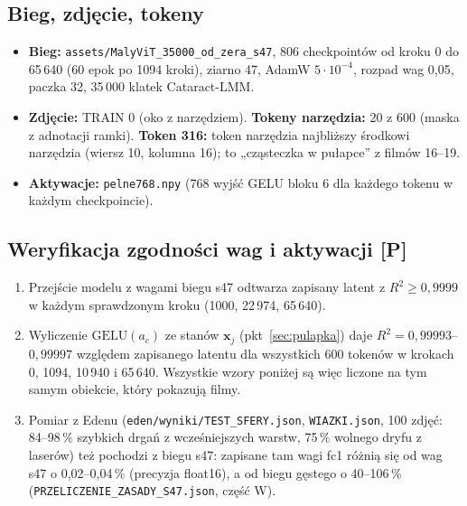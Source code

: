 \documentclass[a4paper,11pt]{article}
\newcommand{\stP}{\textcolor{pom}{\textsf{\textbf{[P]}}}}
\newcommand{\GELU}{\mathrm{GELU}}
\begin{document}
\subsection{Bieg, zdjęcie, tokeny}
\begin{itemize}
\item \textbf{Bieg:} \texttt{assets/MalyViT\_35000\_od\_zera\_s47}, 806 checkpointów od kroku 0 do 65\,640 (60 epok po 1094 kroki),
ziarno 47, AdamW $5\cdot10^{-4}$, rozpad wag 0,05, paczka 32, 35\,000 klatek Cataract-LMM.
\item \textbf{Zdjęcie:} TRAIN 0 (oko z narzędziem). \textbf{Tokeny narzędzia:} 20 z 600 (maska z adnotacji ramki).
\textbf{Token 316:} token narzędzia najbliższy środkowi narzędzia (wiersz 10, kolumna 16); to „cząsteczka w pułapce” z filmów 16--19.
\item \textbf{Aktywacje:} \texttt{pelne768.npy} (768 wyjść GELU bloku 6 dla każdego tokenu w każdym checkpoincie).
\end{itemize}

\subsection{Weryfikacja zgodności wag i aktywacji \stP}
\begin{enumerate}
\item Przejście modelu z wagami biegu s47 odtwarza zapisany latent z $R^2\ge0{,}9999$ w każdym sprawdzonym kroku (1000, 22\,974, 65\,640).
\item Wyliczenie $\GELU(a_c)$ ze stanów $\bm x_j$ (pkt~\ref{sec:pulapka}) daje $R^2 = 0{,}99993$--$0{,}99997$ względem zapisanego latentu
dla wszystkich 600 tokenów w krokach 0, 1094, 10\,940 i 65\,640. Wszystkie wzory poniżej są więc liczone na tym samym obiekcie,
który pokazują filmy.
\item Pomiar z Edenu (\texttt{eden/wyniki/TEST\_SFERY.json}, \texttt{WIAZKI.json}, 100 zdjęć: 84--98\,\% szybkich drgań z wcześniejszych
warstw, 75\,\% wolnego dryfu z laserów) też pochodzi z biegu s47: zapisane tam wagi fc1 różnią się od wag s47 o 0,02--0,04\,\%
(precyzja float16), a od biegu gęstego o 40--106\,\% (\texttt{PRZELICZENIE\_ZASADY\_S47.json}, część W).
\end{enumerate}
\end{document}
